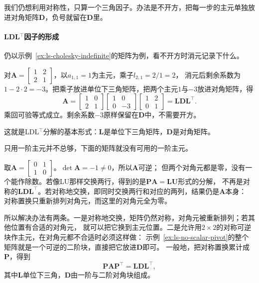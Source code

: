 我们仍想利用对称性，只算一个三角因子。办法是不开方，把每一步的主元单独放进对角矩阵$\bm D$，负号就留在$\bm D$里。

\paragraph{LDL$^{\top}$因子的形成}

仍以示例~\ref{ex:ls-cholesky-indefinite}的矩阵为例，看不开方时消元记录下什么。

\begin{example}
\label{ex:ls-ldlt-two-by-two}
对$\bm A=\left[\begin{smallmatrix}1&2\\2&1\end{smallmatrix}\right]$，以$a_{1,1}=1$为主元，乘子$l_{2,1}=2/1=2$，
消元后剩余系数为$1-2\cdot2=-3$。把乘子放进单位下三角矩阵，把两个主元$1$与$-3$放进对角矩阵，得
\[
 \bm A=\begin{bmatrix}1&0\\2&1\end{bmatrix}
 \begin{bmatrix}1&0\\0&-3\end{bmatrix}
 \begin{bmatrix}1&2\\0&1\end{bmatrix}=\bm L\bm D\bm L^\top .
\]
乘回可验等式成立。剩余系数$-3$原样保留在$\bm D$中，不需要开方。
\end{example}

这就是LDL$^{\top}$分解的基本形式：$\bm L$是单位下三角矩阵，$\bm D$是对角矩阵。

只用一阶主元并不总够，下面的矩阵就没有可用的一阶主元。

\begin{example}[反例：没有一阶主元的对称可逆矩阵]
\label{ex:ls-no-scalar-pivot}
取$\bm A=\left[\begin{smallmatrix}0&1\\1&0\end{smallmatrix}\right]$。$\det\bm A=-1\neq0$，所以$\bm A$可逆；
但两个对角元都是零，没有一个能作除数。若像LU那样交换两行，得到的是$\bm P\bm A=\bm L\bm U$形式的分解，
不再是对称的$\bm L\bm D\bm L^\top$。若对称地交换，即同时交换两行和对应的两列，结果仍是$\bm A$本身：
对称置换只重新排列对角元，而这里的对角元全为零。
\end{example}

所以解决办法有两条。一是对称地交换，矩阵仍然对称，对角元被重新排列；若其他位置有合适的对角元，
就可以把它换到主元位置。二是允许用$2\times2$的对称可逆块作主元，在对角元都不合适时必须这样做：
示例~\ref{ex:ls-no-scalar-pivot}的整个矩阵就是一个可逆的二阶块，直接把它放进$\bm D$即可。
一般地，把对称置换累计成$\bm P$，得到
\[
 \bm P\bm A\bm P^\top=\bm L\bm D\bm L^\top,
\]
其中$\bm L$单位下三角，$\bm D$由一阶与二阶对角块组成。

